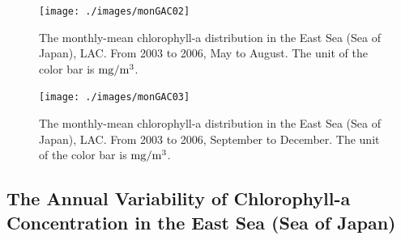 \begin{figure}[p]
	\centering
	\texttt{[image: ./images/monGAC02]}\\
	\caption{The monthly-mean chlorophyll-a distribution in the East Sea (Sea of Japan), LAC. From 2003 to 2006, May to August. The unit of the color bar is $\rm mg/m^3$.}
	\label{fig:monGAC02}
\end{figure}


\begin{figure}[p]
	\centering
	\texttt{[image: ./images/monGAC03]}\\
	\caption{The monthly-mean chlorophyll-a distribution in the East Sea (Sea of Japan), LAC. From 2003 to 2006, September to December. The unit of the color bar is $\rm mg/m^3$.}
	\label{fig:monGAC03}
\end{figure}


\newpage
 
\subsection{The Annual Variability of Chlorophyll-a Concentration in the East Sea (Sea of Japan)}
 




